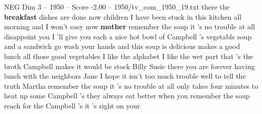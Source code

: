 \begin{textsample}{NEG Dim 3 – 1950 – Score -2.00 – 1950/tv\_com\_1950\_19.txt}  \label{ex:f3_neg_087}
there the \textbf{breakfast} dishes are done now children I have been stuck in this kitchen all morning and I won't easy now \textbf{mother} remember the soup it 's no trouble at all disappoint you I 'll give you each a nice hot bowl of Campbell 's vegetable soup and a sandwich go wash your hands and this soup is delicious makes a good lunch all those good vegetables I like the alphabet I like the wet part that 's the broth Campbell makes it would be stock Billy Susie there you are forever having lunch with the neighbors Jane I hope it isn't too much trouble well to tell the truth Martha remember the soup it 's no trouble at all only takes four minutes to heat up some Campbell 's they always eat better when you remember the soup reach for the Campbell 's it 's right on your

\end{textsample}
